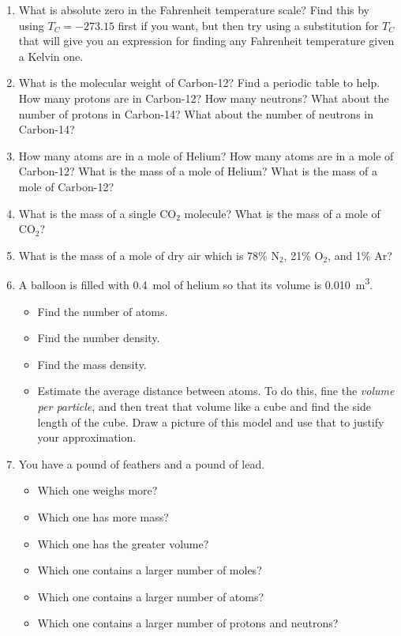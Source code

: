 \begin{enumerate}
\item
What is absolute zero in the Fahrenheit temperature scale? Find this by using $T_C = -273.15$ first if you want, but then try using a substitution for $T_C$ that will give you an expression for finding any Fahrenheit temperature given a Kelvin one.

\item
What is the molecular weight of Carbon-12? Find a periodic table to help. How many protons are in Carbon-12? How many neutrons? What about the number of protons in Carbon-14? What about the number of neutrons in Carbon-14?

\item 
How many atoms are in a mole of Helium? How many atoms are in a mole of Carbon-12? What is the mass of a mole of Helium? What is the mass of a mole of Carbon-12? 

\item
What is the mass of a single CO$_2$ molecule? What is the mass of a mole of CO$_2$?

\item
What is the mass of a mole of dry air which is 78\% N$_2$, 21\% O$_2$, and 1\% Ar?

\item
A balloon is filled with \SI{0.4}{\mole} of helium so that its volume is \SI{0.010}{\cubic \meter}. 
\begin{itemize}
	\setlength\itemsep{1 in}
	\item Find the number of atoms.
	\item Find the number density.
	\item Find the mass density.
	\item Estimate the average distance between atoms. To do this, fine the \emph{volume per particle}, and then treat that volume like a cube and find the side length of the cube. Draw a picture of this model and use that to justify your approximation.
\end{itemize}

\item
You have a pound of feathers and a pound of lead.
\begin{itemize}
	\item Which one weighs more?
	\item Which one has more mass?
	\item Which one has the greater volume?
	\item Which one contains a larger number of moles?
	\item Which one contains a larger number of atoms?
	\item Which one contains a larger number of protons and neutrons?
\end{itemize}


\end{enumerate}
